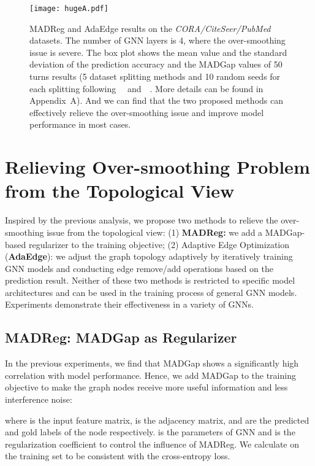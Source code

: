 \documentclass[letterpaper]{article} \usepackage{aaai20}  \usepackage{times}  \usepackage{helvet} \usepackage{courier}  \usepackage[hyphens]{url}  \usepackage{graphicx} \urlstyle{rm} \def\UrlFont{\rm}  \frenchspacing  \setlength{\pdfpagewidth}{8.5in}  \setlength{\pdfpageheight}{11in}  \setcounter{secnumdepth}{0}
\newcommand{\citet}[1]{\citeauthor{#1}~\shortcite{#1}}
\begin{document}
\begin{figure*}[t]
\centering
\texttt{[image: hugeA.pdf]}
\caption{MADReg and AdaEdge results on the \textit{CORA/CiteSeer/PubMed} datasets. The number of GNN layers is 4, where the over-smoothing issue is severe. The box plot shows the mean value and the standard deviation of the prediction accuracy and the MADGap values of 50 turns results (5 dataset splitting methods and 10 random seeds for each splitting following~\citet{dataset_amazon} and~\citet{method_fishergcn}. More details can be found in Appendix~A). And we can find that the two proposed methods can effectively relieve the over-smoothing issue and improve model performance in most cases.}
\label{figure_box}
\end{figure*}


\section{Relieving Over-smoothing Problem from the Topological View}
Inspired by the previous analysis, we propose two methods to relieve the over-smoothing issue from the topological view: 
(1) \textbf{MADReg:} we add a MADGap-based regularizer to the training objective; 
(2) Adaptive Edge Optimization (\textbf{AdaEdge}): we adjust the graph topology adaptively by iteratively training GNN models and conducting edge remove/add operations based on the prediction result.
Neither of these two methods is restricted to specific model architectures and can be used in the training process of general GNN models. Experiments demonstrate their effectiveness in a variety of GNNs. 


\subsection{MADReg: MADGap as Regularizer}
In the previous experiments, we find that MADGap shows a significantly high correlation with model performance. 
Hence, we add MADGap to the training objective to make the graph nodes receive more useful information and less interference noise:

where  is the input feature matrix,  is the adjacency matrix,  and  are the predicted and gold labels of the node respectively.  is the parameters of GNN and  is the regularization coefficient to control the influence of MADReg. 
We calculate  on the training set to be consistent with the cross-entropy loss.
\end{document}
